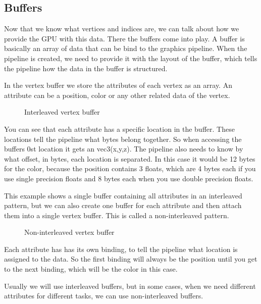 \documentclass[12pt]{report} \usepackage{preamble}
\begin{document}
\subsection{Buffers}

Now that we know what vertices and indices are, we can talk about how we
provide the \ac{GPU} with this data. There the buffers come into play. A buffer
is basically an array of data that can be bind to the graphics pipeline.
When the pipeline is created, we need to provide it with the layout of the
buffer, which tells the pipeline how the data in the buffer is structured.
\cite{vulkan-tutorial-vertex-buffer}

In the vertex buffer we store the attributes of each vertex as an
array. An attribute can be a position, color or any other related data
of the vertex. \cite{vulkan-tutorial-vertex-buffer}

\begin{figure}[hbtp]
	\centering 
	\caption{Interleaved vertex buffer}
\end{figure} \Floatbarrier

You can see that each attribute has a specific location in the buffer.
These locations tell the pipeline what bytes belong together. So when
accessing the buffers 0st location it gets an vec3(x,y,z).  The pipeline
also needs to know by what offset, in bytes, each location is separated.
In this case it would be 12 bytes for the color, because the position
contains 3 floats, which are 4 bytes each if you use single precision
floats and 8 bytes each when you use double precision floats. \cite{vulkan-tutorial-vertex-buffer}

This example shows a single buffer containing all attributes in
an interleaved pattern, but we can also create one buffer for each
attribute and then attach them into a single vertex buffer. This is called
a non-interleaved pattern.

\begin{figure}[hbtp]
	
	\caption{Non-interleaved vertex buffer}
\end{figure} \Floatbarrier

Each attribute has has its own binding, to tell the pipeline what location
is assigned to the data. So the first binding will always be the position
until you get to the next binding, which will be the color in this case.
\cite{vulkan-tutorial-vertex-buffer}

Usually we will use interleaved buffers, but in some cases, when we need
different attributes for different tasks, we can use non-interleaved
buffers.
\end{document}
